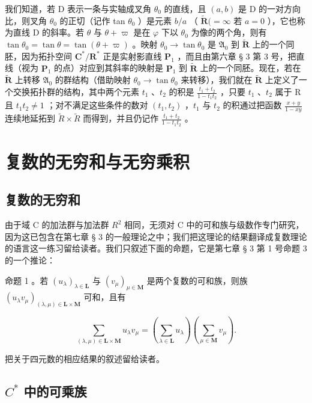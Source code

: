 我们知道，若 D 表示一条与实轴成叉角 \(\theta_0\) 的直线，且 \((a, b)\) 是 D 的一对方向比，则叉角 \(\theta_0\) 的正切（记作 tan \(\theta_0\) ）是元素 \(b/a\) （ \(\tilde{\mathbf{R}} (= \infty\) 若 \(a = 0\) ），它也称为直线 D 的斜率。若 \(\theta\) 与 \(\theta + \varpi\) 是在 \(\varphi\) 下以 \(\theta_0\) 为像的两个角，则有 \(\tan \theta_0 = \tan \theta = \tan (\theta + \varpi)\) 。映射 \(\theta_0 \to \tan \theta_0\) 是 \(\mathfrak{A}_0\) 到 \(\tilde{\mathbf{R}}\) 上的一个同胚，因为拓扑空间 \(\mathbf{C}^*/\mathbf{R}^*\) 正是实射影直线 \(\mathbf{P}_1\) ，而且由第六章 § 3 第 3 号，把直线（视为 \(\mathbf{P}_1\) 的点）对应到其斜率的映射是 \(\mathbf{P}_1\) 到 \(\tilde{\mathbf{R}}\) 上的一个同胚。现在，若在 \(\tilde{\mathbf{R}}\) 上转移 \(\mathfrak{A}_0\) 的群结构（借助映射 \(\theta_0 \to \tan \theta_0\) 来转移），我们就在 \(\tilde{\mathbf{R}}\) 上定义了一个交换拓扑群的结构，其中两个元素 \(t_1\) 、\(t_2\) 的积是 \(\frac{t_1 + t_2}{1 - t_1 t_2}\) ，只要 \(t_1\) 、\(t_2\) 属于 R 且 \(t_1 t_2 \neq 1\) ；对不满足这些条件的数对 \((t_1, t_2)\) ，\(t_{1}\) 与 \(t_{2}\) 的积通过把函数 \(\frac{x+y}{1-xy}\) 连续地延拓到 \(\tilde{R}\times\tilde{R}\) 而得到，并且仍记作 \(\frac{t_{1}+t_{2}}{1-t_{1}t_{2}}\) 。

\section{复数的无穷和与无穷乘积}

\subsection{复数的无穷和}

由于域 C 的加法群与加法群 \(R^{2}\) 相同，无须对 C 中的可和族与级数作专门研究，因为这已包含在第七章 § 3 的一般理论之中；我们把这理论的结果翻译成复数理论的语言这一练习留给读者。我们只叙述下面的命题，它是第七章 § 3 第 1 号命题 3 的一个推论：

命题 1 。若 \((u_{\lambda})_{\lambda \in \mathbf{L}}\) 与 \((v_{\mu})_{\mu \in \mathbf{M}}\) 是两个复数的可和族，则族 \((u_{\lambda}v_{\mu})_{(\lambda ,\mu)\in \mathbf{L}\times \mathbf{M}}\) 可和，且有

\[
\sum_ {(\lambda , \mu) \in \mathbf {L} \times \mathbf {M}} u _ {\lambda} v _ {\mu} = \left(\sum_ {\lambda \in \mathbf {L}} u _ {\lambda}\right) \left(\sum_ {\mu \in \mathbf {M}} v _ {\mu}\right).\tag{1}
\]

把关于四元数的相应结果的叙述留给读者。

\subsection{\texorpdfstring{\(C^*\) 中的可乘族}{复数乘法群中的可乘族}}

